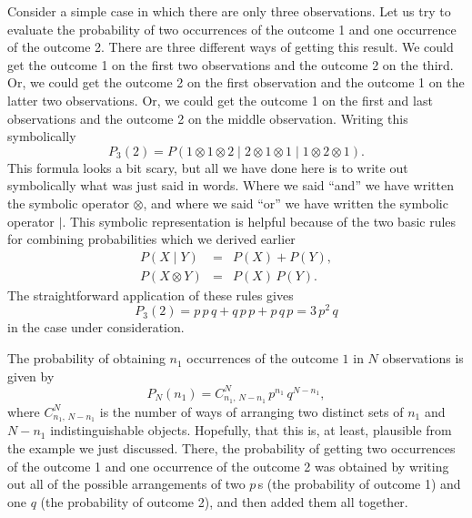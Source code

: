 Consider a simple case in which there are only three observations.
Let us try to evaluate the probability of two occurrences of the outcome 1
and  one occurrence of the outcome 2. There are three different ways
of getting this result. We could get the outcome 1 on the first 
two observations and the outcome 2 on the third. Or, we could get the outcome
2 on the first observation and the outcome 1 on the latter two observations.
Or, we could get the outcome 1 on the first and last observations and the
outcome 2 on the middle observation. Writing this symbolically
\begin{equation}
P_3(2)= 
P(1\otimes 1\otimes 2 \mid 2\otimes 1\otimes 1 \mid 1\otimes 2 \otimes 1).
\end{equation}
This formula looks a bit scary, but all we have done here is to
write out symbolically what was just said in words. Where we said ``and''
we have written the symbolic  operator $\otimes$, 
 and where we said ``or'' we have written
the symbolic  operator $\mid$. This symbolic representation is helpful
 because of the two basic
rules for combining probabilities which we derived earlier
\begin{eqnarray}
P(X\mid Y) &=& P(X) + P(Y),\\
P(X \otimes Y) &=& P(X)\,P(Y).
\end{eqnarray}
The straightforward application of these rules gives
\begin{equation}
P_3(2) = p\,p\,q + q\,p\,p + p\,q\,p = 3 \,p^2\,q
\end{equation}
in the case under consideration.

The  
 probability  of obtaining $n_1$ occurrences of the outcome $1$ in
$N$ observations is given by
\begin{equation}\label{e2.14}
P_N(n_1) = C^{ N}_{n_1,\,N-n_1}\,p^{n_1}\,
 q^{N-n_1},
\end{equation}
where $C^{ N}_{ n_1,\, N-n_1}$ is  the number of ways
of arranging two distinct sets of $n_1$ and $N-n_1$ indistinguishable
objects. Hopefully, that this is, at least, plausible from the example we 
just discussed. There, the probability of
getting two occurrences of the outcome 1 and one occurrence of the
outcome 2 was obtained  by writing  out all of the possible arrangements of two
$p$\,s (the probability of outcome 1) and one $q$ (the probability of
outcome 2), and then added them all together. 

